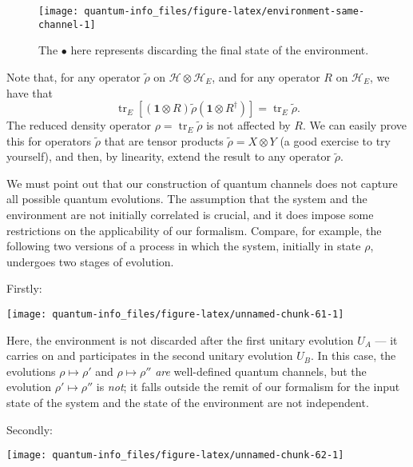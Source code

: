 \documentclass[fleqn]{article}
\begin{document}
\begin{figure}[H]

{\centering \texttt{[image: quantum-info\_files/figure-latex/environment-same-channel-1]} 

}

\caption{The \(\bullet\) here represents discarding the final state of the environment.}\label{fig:environment-same-channel}
\end{figure}

Note that, for any operator \(\tilde{\rho}\) on \(\mathcal{H}\otimes\mathcal{H}_E\), and for any operator \(R\) on \(\mathcal{H}_E\), we have that
\[
  \operatorname{tr}_E\left[
    (\mathbf{1}\otimes R) \tilde{\rho} (\mathbf{1}\otimes R^\dagger)
  \right] = \operatorname{tr}_E \tilde{\rho}.
\]
The reduced density operator \(\rho=\operatorname{tr}_E\tilde{\rho}\) is not affected by \(R\).
We can easily prove this for operators \(\tilde{\rho}\) that are tensor products \(\tilde{\rho}=X\otimes Y\) (a good exercise to try yourself), and then, by linearity, extend the result to any operator \(\tilde{\rho}\).

We must point out that our construction of quantum channels does not capture all possible quantum evolutions.
The assumption that the system and the environment are not initially correlated is crucial, and it does impose some restrictions on the applicability of our formalism.
Compare, for example, the following two versions of a process in which the system, initially in state \(\rho\), undergoes two stages of evolution.

Firstly:

\begin{center}\texttt{[image: quantum-info\_files/figure-latex/unnamed-chunk-61-1]} \end{center}

Here, the environment is not discarded after the first unitary evolution \(U_A\) --- it carries on and participates in the second unitary evolution \(U_B\).
In this case, the evolutions \(\rho\mapsto\rho'\) and \(\rho\mapsto\rho''\) \emph{are} well-defined quantum channels, but the evolution \(\rho'\mapsto\rho''\) is \emph{not}; it falls outside the remit of our formalism for the input state of the system and the state of the environment are not independent.

Secondly:

\begin{center}\texttt{[image: quantum-info\_files/figure-latex/unnamed-chunk-62-1]} \end{center}
\end{document}
